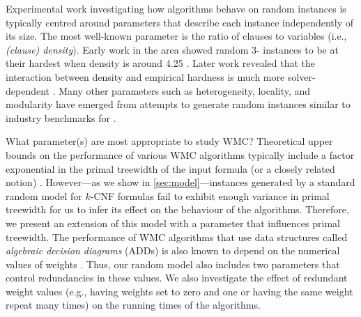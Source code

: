Experimental work investigating how \SAT{} algorithms behave on random
instances is typically centred around parameters that describe each instance
independently of its size. The most well-known parameter is the ratio of clauses
to variables (i.e., \emph{(clause) density}). Early work in the area
showed random 3-\SAT{} instances to be at their hardest when density is
around 4.25 \citep{DBLP:conf/aaai/MitchellSL92}. Later work revealed that the
interaction between density and empirical hardness is much more
solver-dependent \citep{DBLP:journals/constraints/CoarfaDASV03}. Many other
parameters such as heterogeneity, locality, and modularity have emerged from
attempts to generate random instances similar to industry benchmarks for
\SAT{} \citep{DBLP:conf/ijcai/AnsoteguiBL09,DBLP:conf/tacas/BlasiusFS19,DBLP:journals/ai/Giraldez-CruL16,DBLP:conf/ijcai/Giraldez-CruL17}.

What parameter(s) are most appropriate to study \textsf{WMC}? Theoretical upper
bounds on the performance of various \textsf{WMC} algorithms typically include a
factor exponential in the primal treewidth of the input formula (or a closely
related
notion) \citep{DBLP:journals/jair/BacchusDP09,DBLP:journals/jacm/Darwiche01,DBLP:conf/ecai/Darwiche04,DBLP:conf/sat/SangBBKP04}.
However---as we show in \cref{sec:model}---instances generated by a standard
random model for $k$-CNF formulas fail to exhibit enough variance in primal
treewidth for us to infer its effect on the behaviour of the algorithms.
Therefore, we present an extension of this model with a parameter that
influences primal treewidth. The performance of \textsf{WMC} algorithms that use
data structures called \emph{algebraic decision diagrams}
(ADDs) \citep{DBLP:journals/fmsd/BaharFGHMPS97} is also known to depend on the
numerical values of
weights \citep{DBLP:conf/aaai/DudekPV20,DBLP:conf/cp/DudekPV20}. Thus, our random
model also includes two parameters that control redundancies in these values.
We also
investigate the effect of redundant weight values (e.g., having weights set to
zero and one or having the same weight repeat many times) on the running times
of the algorithms.


